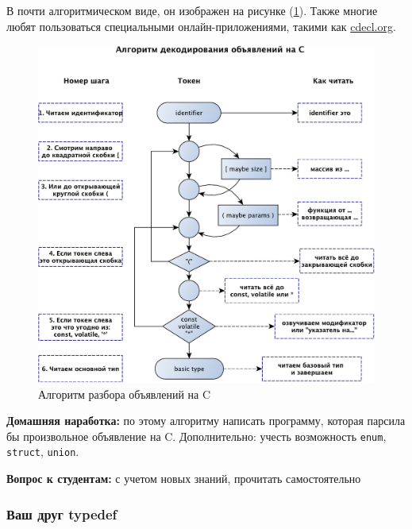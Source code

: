\documentclass[a4paper,12pt,oneside]{article}
\newif\ifanswers
\begin{document}
В почти алгоритмическом виде, он изображен на рисунке (\ref{fig:cdecl_parse}). Также многие любят пользоваться специальными онлайн-приложениями, такими как \url{cdecl.org}.

\begin{figure}[h!]
\centering
\includegraphics[width=1.0\textwidth]{illustrations/cdecls-crop.pdf}
\caption{Алгоритм разбора объявлений на C}
\label{fig:cdecl_parse}
\end{figure}

\textbf{Домашняя наработка:} по этому алгоритму написать программу, которая парсила бы произвольное объявление на C. Дополнительно: учесть возможность \lstinline!enum!, \lstinline!struct!, \lstinline!union!.

\textbf{Вопрос к студентам:} с учетом новых знаний, прочитать самостоятельно



\ifanswers
Ответ: c is array of 10 pointers to functions, accepting pointer to pointer to int and returning pointer to char.
\fi

\subsubsection{Ваш друг typedef}\label{FriendTypedef}
\end{document}
